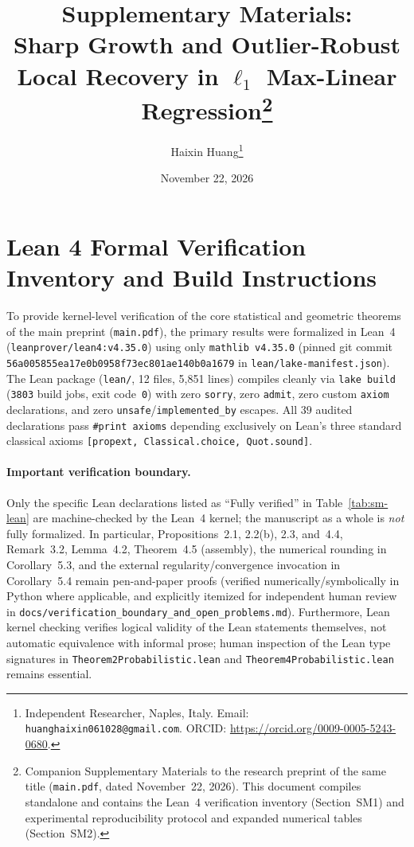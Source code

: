 \documentclass[11pt]{article}
\title{\bfseries Supplementary Materials:\\Sharp Growth and Outlier-Robust Local Recovery in $\ell_1$ Max-Linear Regression\thanks{Companion Supplementary Materials to the research preprint of the same title (\texttt{main.pdf}, dated November~22, 2026). This document compiles standalone and contains the Lean~4 verification inventory (Section~SM1) and experimental reproducibility protocol and expanded numerical tables (Section~SM2).}}
\author{Haixin Huang\thanks{Independent Researcher, Naples, Italy. Email: \texttt{huanghaixin061028@gmail.com}. ORCID: \url{https://orcid.org/0009-0005-5243-0680}.}}
\date{November 22, 2026}
\begin{document}
\maketitle

\section{Lean 4 Formal Verification Inventory and Build Instructions}
\label{sec:sm-lean}

To provide kernel-level verification of the core statistical and geometric theorems of the main preprint (\texttt{main.pdf}), the primary results were formalized in Lean~4 (\texttt{leanprover/lean4:v4.35.0}) using only \texttt{mathlib v4.35.0} (pinned git commit \texttt{56a005855ea17e0b0958f73ec801ae140b0a1679} in \texttt{lean/lake-manifest.json}). The Lean package (\texttt{lean/}, 12 files, 5{,}851 lines) compiles cleanly via \texttt{lake build} (\texttt{3803} build jobs, exit code~\texttt{0}) with zero \texttt{sorry}, zero \texttt{admit}, zero custom \texttt{axiom} declarations, and zero \texttt{unsafe}/\texttt{implemented\_by} escapes. All $39$ audited declarations pass \texttt{\#print axioms} depending exclusively on Lean's three standard classical axioms \texttt{[propext, Classical.choice, Quot.sound]}.

\paragraph{Important verification boundary.}
Only the specific Lean declarations listed as ``Fully verified'' in Table~\ref{tab:sm-lean} are machine-checked by the Lean~4 kernel; the manuscript as a whole is \emph{not} fully formalized. In particular, Propositions~2.1, 2.2(b), 2.3, and~4.4, Remark~3.2, Lemma~4.2, Theorem~4.5 (assembly), the numerical rounding in Corollary~5.3, and the external regularity/convergence invocation in Corollary~5.4 remain pen-and-paper proofs (verified numerically/symbolically in Python where applicable, and explicitly itemized for independent human review in \nolinkurl{docs/verification_boundary_and_open_problems.md}). Furthermore, Lean kernel checking verifies logical validity of the Lean statements themselves, not automatic equivalence with informal prose; human inspection of the Lean type signatures in \texttt{Theorem2Probabilistic.lean} and \texttt{Theorem4Probabilistic.lean} remains essential.
\end{document}
